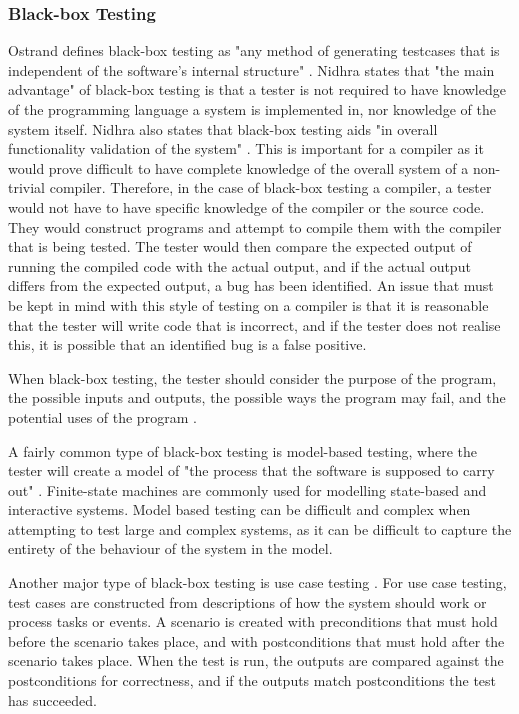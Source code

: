 \subsubsection{Black-box Testing}
Ostrand defines black-box testing as "any method of generating testcases that is independent of the software's internal structure" \cite{ostrand}. Nidhra \cite{nidhra} states that "the main advantage" of black-box testing is that a tester is not required to have knowledge of the programming language a system is implemented in, nor knowledge of the system itself. Nidhra also states that black-box testing aids "in overall functionality validation of the system" \cite{nidhra}. This is important for a compiler as it would prove difficult to have complete knowledge of the overall system of a non-trivial compiler. Therefore, in the case of black-box testing a compiler, a tester would not have to have specific knowledge of the compiler or the source code. They would construct programs and attempt to compile them with the compiler that is being tested. The tester would then compare the expected output of running the compiled code with the actual output, and if the actual output differs from the expected output, a bug has been identified. An issue that must be kept in mind with this style of testing on a compiler is that it is reasonable that the tester will write code that is incorrect, and if the tester does not realise this, it is possible that an identified bug is a false positive.

When black-box testing, the tester should consider the purpose of the program, the possible inputs and outputs, the possible ways the program may fail, and the potential uses of the program \cite{ostrand}. 

A fairly common type of black-box testing is model-based testing, where the tester will create a model of "the process that the software is supposed to carry out" \cite{ostrand}. Finite-state machines are commonly used for modelling state-based and interactive systems. Model based testing can be difficult and complex when attempting to test large and complex systems, as it can be difficult to capture the entirety of the behaviour of the system in the model.

Another major type of black-box testing is use case testing \cite{ostrand}. For use case testing, test cases are constructed from descriptions of how the system should work or process tasks or events. A scenario is created with preconditions that must hold before the scenario takes place, and with postconditions that must hold after the scenario takes place. When the test is run, the outputs are compared against the postconditions for correctness, and if the outputs match postconditions the test has succeeded.

